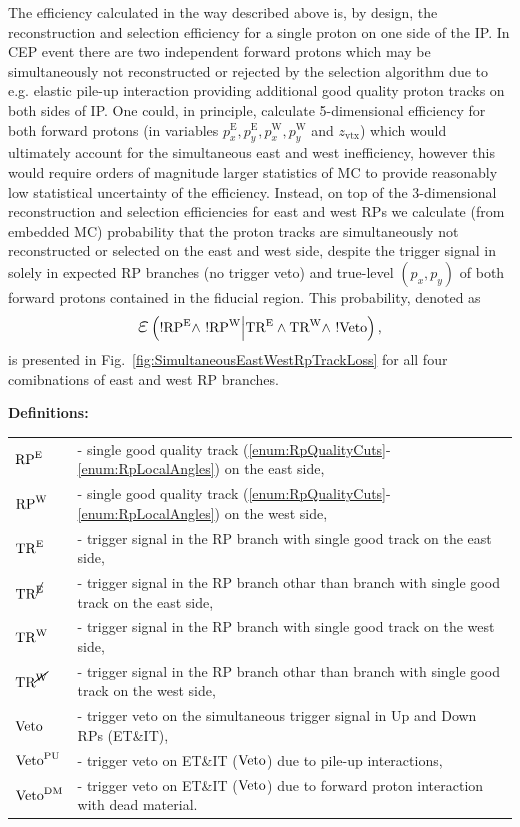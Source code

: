 

The efficiency calculated in the way described above is, by design, the reconstruction and selection efficiency for a single proton on one side of the IP. In CEP event there are two independent forward protons which may be simultaneously not reconstructed or rejected by the selection algorithm due to e.g. elastic pile-up interaction providing additional good quality proton tracks on both sides of IP. One could, in principle, calculate 5-dimensional efficiency for both forward protons (in variables $p_{x}^{\text{E}}, p_{y}^{\text{E}}, p_{x}^{\text{W}}, p_{y}^{\text{W}}$ and $z_{\text{vtx}}$) which would ultimately account for the simultaneous east and west inefficiency, however this would require orders of magnitude larger statistics of MC to provide reasonably low statistical uncertainty of the efficiency. Instead, on top of the 3-dimensional reconstruction and selection efficiencies for east and west RPs we calculate (from embedded MC) probability that the proton tracks are simultaneously not reconstructed or selected on the east and west side, despite the trigger signal in solely in expected RP branches (no trigger veto) and true-level $(p_{x}, p_{y})$ of both forward protons contained in the fiducial region. This probability, denoted as
\begin{equation}
\mbox{\LARGE$\varepsilon$}\left(!\RPE\land~!\RPW\Big|\TRE\land\TRW\land~!\V\Big.\right),
\end{equation}
 is presented in Fig.~\ref{fig:SimultaneousEastWestRpTrackLoss} for all four comibnations of east and west RP branches.

\textbf{Definitions:}\\[4pt]
\begin{tabular}{ll}
$\text{RP}^{\text{E}}$ &- single good quality track (\ref{enum:RpQualityCuts}-\ref{enum:RpLocalAngles}) on the east side,\\
$\text{RP}^{\text{W}}$ & - single good quality track (\ref{enum:RpQualityCuts}-\ref{enum:RpLocalAngles}) on the west side,\\
$\text{TR}^{\text{E}}$ & - trigger signal in the RP branch with single good track on the east side,\\
$\text{TR}^{\cancel{\text{E}}}$ & - trigger signal in the RP branch othar than branch with single good track on the east side,\\
$\text{TR}^{\text{W}}$ & - trigger signal in the RP branch with single good track on the west side,\\
$\text{TR}^{\cancel{\text{W}}}$ & - trigger signal in the RP branch othar than branch with single good track on the west side,\\
$\text{Veto}$ & - trigger veto on the simultaneous trigger signal in Up and Down RPs (ET\&IT),\\
$\text{Veto}^{\text{PU}}$ & - trigger veto on ET\&IT ($\text{Veto}$) due to pile-up interactions,\\
$\text{Veto}^{\text{DM}}$ & - trigger veto on ET\&IT ($\text{Veto}$) due to forward proton interaction with dead material.\\ 
\end{tabular}\vspace{10pt}


